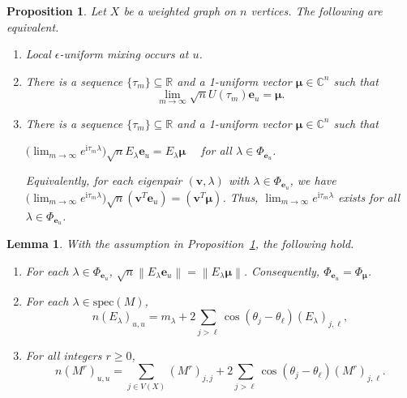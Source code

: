 \documentclass[10pt,a4paper]{amsart}
\newtheorem{proposition}{Proposition}
\newtheorem{lemma}{Lemma}
\def\C{\mathbb{C}}
\def\R{\mathbb{R}}
\newcommand{\be}{\mathbf e}
\newcommand{\bmu}{{\boldsymbol{\mu}}}
\newcommand{\bv}{\mathbf v}
\def\ii{\mathrm{i}}
\newcommand\spec{{\mathrm{spec}}}
\newcommand{\supp}{{\Phi}}
\begin{document}
\begin{proposition}
\label{proplum}
Let $X$ be a weighted graph on $n$ vertices. The following are equivalent.
\begin{enumerate}
\item Local $\epsilon$-uniform mixing occurs at $u$.
\item There is a sequence $\{\tau_m\}\subseteq\R$ and a 1-uniform vector $\bmu\in\C^n$ such that
\begin{equation}
\label{locum}
\lim_{m\rightarrow\infty}\sqrt{n}U(\tau_m)\be_u=\bmu.
\end{equation}
\item There is a sequence $\{\tau_m\}\subseteq\R$ and a 1-uniform vector $\bmu\in\C^n$ such that 
\begin{center}
$\big(\displaystyle\lim_{m\rightarrow\infty}e^{\ii \tau_m\lambda}\big)\sqrt{n}E_\lambda\be_u=E_\lambda\bmu\quad $ for all $\lambda\in\supp_{\be_u}$.
\end{center}
Equivalently, for each eigenpair $(\bv,\lambda)$ with $\lambda\in\supp_{\be_u}$, we have $\big(\displaystyle\lim_{m\rightarrow\infty}e^{\ii\tau_m\lambda}\big)\sqrt{n}(\bv^T\be_u)=(\bv^T\bmu)$. Thus, $\displaystyle\lim_{m\rightarrow\infty}e^{\ii\tau_m\lambda}$ exists for all  $\lambda\in\supp_{\be_u}$.
\end{enumerate}
\end{proposition}

\begin{lemma}
\label{Lem:no1col}
With the assumption in Proposition~\ref{proplum}, the following hold. 
\begin{enumerate}
\item For each $\lambda\in\supp_{\be_u}$, $\sqrt{n}\left\|E_\lambda\be_u\right\|=\left\|E_\lambda\bmu\right\|$. Consequently, $\supp_{\be_u}=\supp_{\bmu}$.
\item 
For each $\lambda\in\spec(M)$, %
\begin{equation}
\label{111}
n(E_\lambda)_{u,u}=m_\lambda+2\sum_{j>\ell}\cos(\theta_j-\theta_{\ell})(E_\lambda)_{j,{\ell}},
\end{equation}
\item For all integers $r\geq 0$,
\begin{equation}
\label{cosp}
n(M^r)_{u,u}=\sum_{j\in V(X)}(M^r)_{j,j}+2\sum_{j>\ell}\cos(\theta_j-\theta_{\ell})(M^r)_{j,{\ell}}.
\end{equation}
\end{enumerate}
\end{lemma}
\end{document}
